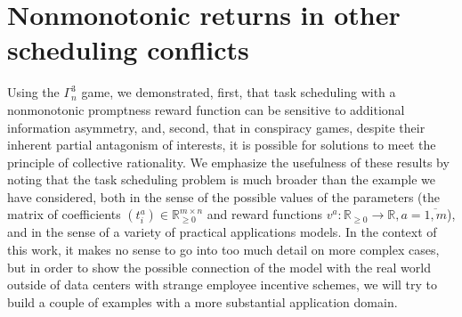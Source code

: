 \section{Nonmonotonic returns in other scheduling conflicts}\label{sec:ch2/sec7}

Using the $\Gamma^3_n$ game, we demonstrated, first, that task scheduling with a nonmonotonic promptness reward function can be sensitive to additional information asymmetry, and, second, that in conspiracy games, despite their inherent partial antagonism of interests, it is possible for solutions to meet the principle of collective rationality. We emphasize the usefulness of these results by noting that the task scheduling problem is much broader than the example we have considered, both in the sense of the possible values of the parameters (the matrix of coefficients $(t_i^a) \in \mathbb{R}_{\ge 0}^{m \times n}$ and reward functions $v^a : \mathbb{R}_{\ge 0} \rightarrow \mathbb{R}, a = \overline{1,m}$), and in the sense of a variety of practical applications models. In the context of this work, it makes no sense to go into too much detail on more complex cases, but in order to show the possible connection of the model with the real world outside of data centers with strange employee incentive schemes, we will try to build a couple of examples with a more substantial application domain. %

